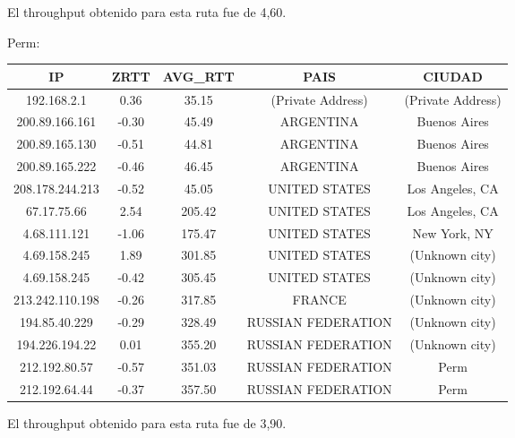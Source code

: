 El throughput obtenido para esta ruta fue de 4,60.

\medskip

Perm:

\begin{tabular}{|c@{\hspace{5ex}}c@{\hspace{5ex}}c@{\hspace{5ex}}c@{\hspace{5ex}}c|}
 \hline
 \rule{0pt}{1.2em}IP & ZRTT & AVG\_RTT & PAIS & CIUDAD\\[0.2em]
 \hline

\rule{0pt}{1.2em} 192.168.2.1  &  0.36 & 35.15 & (Private Address) & (Private Address) \\[0.2em]
\rule{0pt}{1.2em} 200.89.166.161  &  -0.30 & 45.49 & ARGENTINA & Buenos Aires \\[0.2em]
\rule{0pt}{1.2em} 200.89.165.130  &  -0.51 & 44.81 & ARGENTINA & Buenos Aires \\[0.2em]
\rule{0pt}{1.2em} 200.89.165.222  &  -0.46 & 46.45 & ARGENTINA & Buenos Aires \\[0.2em]
\rule{0pt}{1.2em} 208.178.244.213  &  -0.52 & 45.05 & UNITED STATES & Los Angeles, CA \\[0.2em]
\rule{0pt}{1.2em} 67.17.75.66  &  2.54 & 205.42 & UNITED STATES & Los Angeles, CA \\[0.2em]
\rule{0pt}{1.2em} 4.68.111.121  &  -1.06 & 175.47 & UNITED STATES & New York, NY \\[0.2em]
\rule{0pt}{1.2em} 4.69.158.245  &  1.89 & 301.85 & UNITED STATES & (Unknown city) \\[0.2em]
\rule{0pt}{1.2em} 4.69.158.245  &  -0.42 & 305.45 & UNITED STATES & (Unknown city) \\[0.2em]
\rule{0pt}{1.2em} 213.242.110.198  &  -0.26 & 317.85 & FRANCE & (Unknown city) \\[0.2em]
\rule{0pt}{1.2em} 194.85.40.229  &  -0.29 & 328.49 & RUSSIAN FEDERATION & (Unknown city) \\[0.2em]
\rule{0pt}{1.2em} 194.226.194.22  &  0.01 & 355.20 & RUSSIAN FEDERATION & (Unknown city) \\[0.2em]
\rule{0pt}{1.2em} 212.192.80.57  &  -0.57 & 351.03 & RUSSIAN FEDERATION & Perm \\[0.2em]
\rule{0pt}{1.2em} 212.192.64.44  &  -0.37 & 357.50 & RUSSIAN FEDERATION & Perm \\[0.2em]
\hline
 \end{tabular}

El throughput obtenido para esta ruta fue de 3,90.

